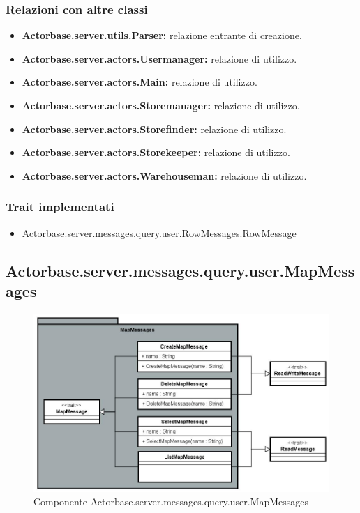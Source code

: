 \documentclass[a4paper]{article}
\begin{document}
			\subsubsection{Relazioni con altre classi}
				\begin{itemize}
					\item \textbf{Actorbase.server.utils.Parser:} relazione entrante di creazione.
					\item \textbf{Actorbase.server.actors.Usermanager:} relazione di utilizzo.
					\item \textbf{Actorbase.server.actors.Main:} relazione di utilizzo.
					\item \textbf{Actorbase.server.actors.Storemanager:} relazione di utilizzo.
					\item \textbf{Actorbase.server.actors.Storefinder:} relazione di utilizzo.
					\item \textbf{Actorbase.server.actors.Storekeeper:} relazione di utilizzo.
					\item \textbf{Actorbase.server.actors.Warehouseman:} relazione di utilizzo.
				\end{itemize}
			\subsubsection{Trait implementati}
				\begin{itemize}
					\item Actorbase.server.messages.query.user.RowMessages.RowMessage
				\end{itemize}
			
		\subsection{Actorbase.server.messages.query.user.MapMessages}
		
			\begin{figure}[H]
				\centering
				\includegraphics[scale=0.70]{ST/Server/mapMessagesLevel}
				\caption{Componente Actorbase.server.messages.query.user.MapMessages}
			\end{figure}
			
\end{document}
